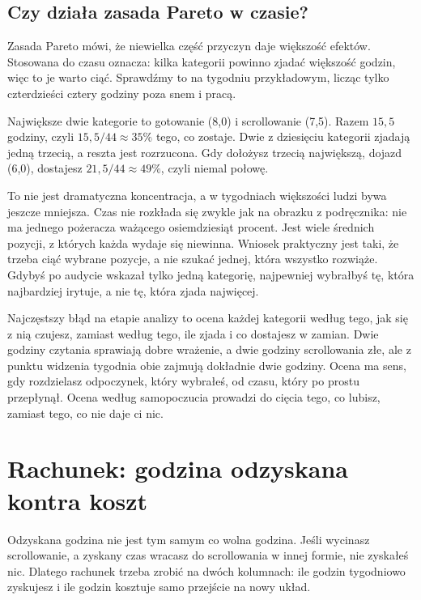 \subsection*{Czy działa zasada Pareto w czasie?}

Zasada Pareto mówi, że niewielka część przyczyn daje większość efektów. Stosowana do czasu oznacza: kilka kategorii powinno zjadać większość godzin, więc to je warto ciąć. Sprawdźmy to na tygodniu przykładowym, licząc tylko czterdzieści cztery godziny poza snem i pracą.

Największe dwie kategorie to gotowanie (8,0) i scrollowanie (7,5). Razem $15{,}5$ godziny, czyli $15{,}5 / 44 \approx 35\%$ tego, co zostaje. Dwie z dziesięciu kategorii zjadają jedną trzecią, a reszta jest rozrzucona. Gdy dołożysz trzecią największą, dojazd (6,0), dostajesz $21{,}5 / 44 \approx 49\%$, czyli niemal połowę.

To nie jest dramatyczna koncentracja, a w tygodniach większości ludzi bywa jeszcze mniejsza. Czas nie rozkłada się zwykle jak na obrazku z podręcznika: nie ma jednego pożeracza ważącego osiemdziesiąt procent. Jest wiele średnich pozycji, z których każda wydaje się niewinna. Wniosek praktyczny jest taki, że trzeba ciąć wybrane pozycje, a nie szukać jednej, która wszystko rozwiąże. Gdybyś po audycie wskazał tylko jedną kategorię, najpewniej wybrałbyś tę, która najbardziej irytuje, a nie tę, która zjada najwięcej.

\begin{falle}
Najczęstszy błąd na etapie analizy to ocena każdej kategorii według tego, jak się z nią czujesz, zamiast według tego, ile zjada i co dostajesz w zamian. Dwie godziny czytania sprawiają dobre wrażenie, a dwie godziny scrollowania złe, ale z punktu widzenia tygodnia obie zajmują dokładnie dwie godziny. Ocena ma sens, gdy rozdzielasz odpoczynek, który wybrałeś, od czasu, który po prostu przepłynął. Ocena według samopoczucia prowadzi do cięcia tego, co lubisz, zamiast tego, co nie daje ci nic.
\end{falle}

\section{Rachunek: godzina odzyskana kontra koszt}

Odzyskana godzina nie jest tym samym co wolna godzina. Jeśli wycinasz scrollowanie, a zyskany czas wracasz do scrollowania w innej formie, nie zyskałeś nic. Dlatego rachunek trzeba zrobić na dwóch kolumnach: ile godzin tygodniowo zyskujesz i ile godzin kosztuje samo przejście na nowy układ.

